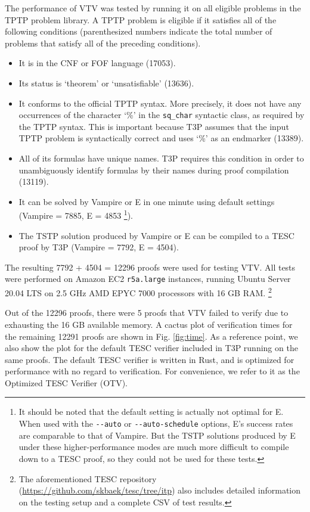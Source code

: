 \documentclass{lipics-v2021}
\begin{document}
The performance of VTV was tested by running it on all eligible problems 
in the TPTP \cite{sutcliffe2009tptp} problem library. A TPTP problem is eligible if it 
satisfies all of the following conditions (parenthesized numbers indicate 
the total number of problems that satisfy all of the preceding conditions).
\begin{itemize}
  \item It is in the CNF or FOF language (17053). 
  \item Its status is `theorem' or `unsatisfiable' (13636).
  \item It conforms to the official TPTP syntax. More precisely, 
    it does not have any occurrences of the character `\%' in the 
    \verb|sq_char| syntactic class, as required by the TPTP syntax.
    This is important because T3P assumes that the input TPTP problem 
    is syntactically correct and uses `\%' as an endmarker (13389).
  \item All of its formulas have unique names. T3P requires this condition 
    in order to unambiguously identify formulas by their names during 
    proof compilation (13119).
  \item It can be solved by Vampire \cite{riazanov2002design} or E \cite{schulz2002brainiac} 
      in one minute using default settings (Vampire = 7885, E = 4853 \footnote{
      It should be noted that the default setting is actually not 
      optimal for E. When used with the \verb|--auto| or \verb|--auto-schedule|
      options, E's success rates are comparable to that of Vampire. 
      But the TSTP solutions produced by E under these higher-performance modes 
      are much more difficult to compile down to a TESC proof, so they 
      could not be used for these tests.
    }).
  \item The TSTP solution produced by Vampire or E can be compiled to 
    a TESC proof by T3P (Vampire = 7792, E = 4504).
\end{itemize}
The resulting 7792 + 4504 = 12296 proofs were used for testing VTV.
All tests were performed on Amazon EC2 \texttt{r5a.large} instances, 
running Ubuntu Server 20.04 LTS on 2.5 GHz AMD EPYC 7000 processors with 
16 GB RAM. 
\footnote{
  The aforementioned TESC repository (\url{https://github.com/skbaek/tesc/tree/itp})
  also includes detailed information on the testing setup and a complete CSV of test results.
}

Out of the 12296 proofs, there were 5 proofs that VTV failed to verify 
due to exhausting the 16 GB available memory. A cactus plot of verification 
times for the remaining 12291 proofs are shown in Fig. \ref{fig:time}. 
As a reference point, we also show the plot for the default TESC verifier 
included in T3P running on the same proofs. The default TESC verifier 
is written in Rust, and is optimized for performance with no regard to 
verification. For convenience, we refer to it as the Optimized TESC Verifier (OTV).
\end{document}
